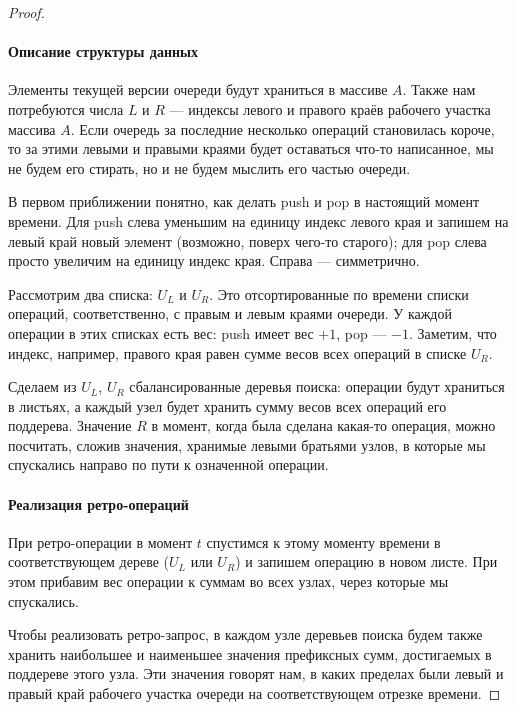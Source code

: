 \begin{proof} \item \vspace{-7mm}
\paragraph{Описание структуры данных} Элементы текущей версии очереди будут храниться в массиве $A$. Также нам потребуются числа $L$ и $R$ — индексы левого и правого краёв рабочего участка массива $A$. Если очередь за последние несколько операций становилась короче, то за этими левыми и правыми краями будет оставаться что-то написанное, мы не будем его стирать, но и не будем мыслить его частью очереди.

	В первом приближении понятно, как делать push и pop в настоящий момент времени. Для push слева уменьшим на единицу индекс левого края и запишем на левый край новый элемент (возможно, поверх чего-то старого); для pop слева просто увеличим на единицу индекс края. Справа — симметрично.

	Рассмотрим два списка: $U_L$ и $U_R$. Это отсортированные по времени списки операций, соответственно, с правым и левым краями очереди. У каждой операции в этих списках есть вес: push имеет вес $+1$, pop — $-1$. Заметим, что индекс, например, правого края равен сумме весов всех операций в списке $U_R$.

	Сделаем из $U_L$, $U_R$ сбалансированные деревья поиска: операции будут храниться в листьях, а каждый узел будет хранить сумму весов всех операций его поддерева. Значение $R$ в момент, когда была сделана какая-то операция, можно посчитать, сложив значения, хранимые левыми братьями узлов, в которые мы спускались направо по пути к означенной операции. \vspace{-4mm}

\paragraph{Реализация ретро-операций} При ретро-операции в момент $t$ спустимся к этому моменту времени в соответствующем дереве ($U_L$ или $U_R$) и запишем операцию в новом листе. При этом прибавим вес операции к суммам во всех узлах, через которые мы спускались.

	Чтобы реализовать ретро-запрос, в каждом узле деревьев поиска будем также хранить наибольшее и наименьшее значения префиксных сумм, достигаемых в поддереве этого узла. Эти значения говорят нам, в каких пределах были левый и правый край рабочего участка очереди на соответствующем отрезке времени.


\end{proof}
